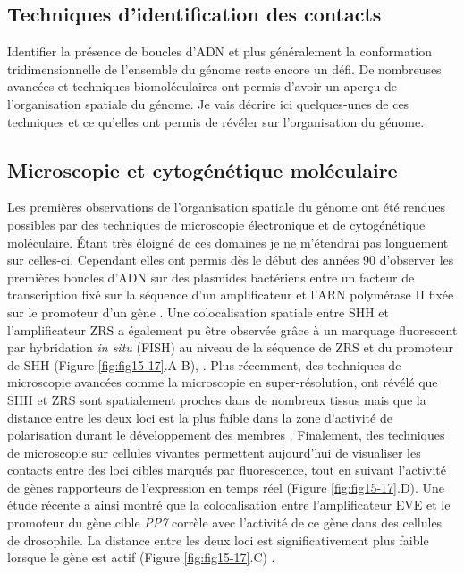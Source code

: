 \subsection{Techniques d’identification des contacts}
\label{subsec:contact-identification}

Identifier la présence de boucles d’ADN et plus généralement la conformation tridimensionnelle de l’ensemble du génome reste encore un défi. De nombreuses avancées et techniques biomoléculaires ont permis d’avoir un aperçu de l’organisation spatiale du génome. Je vais décrire ici quelques-unes de ces techniques et ce qu’elles ont permis de révéler sur l’organisation du génome.

\subsection{Microscopie et cytogénétique moléculaire}
\label{subsec:microscopie}

Les premières observations de l’organisation spatiale du génome ont été rendues possibles par des techniques de microscopie électronique et de cytogénétique moléculaire. Étant très éloigné de ces domaines je ne m'étendrai pas longuement sur celles-ci. Cependant elles ont permis dès le début des années 90 d’observer les premières boucles d’ADN sur des plasmides bactériens entre un facteur de transcription fixé sur la séquence d’un \gls{amplificateur} et l’ARN polymérase II fixée sur le promoteur d’un gène \citep{su_dna-looping_1990}. Une colocalisation spatiale entre \acrshort{SHH} et l’\gls{amplificateur} \acrshort{ZRS} a également pu être observée grâce à un marquage fluorescent par hybridation \textit{in situ} (FISH) au niveau de la séquence de \acrshort{ZRS} et du promoteur de \acrshort{SHH} (Figure \ref{fig:fig15-17}.A-B), \citep{amano_chromosomal_2009}. Plus récemment, des techniques de microscopie avancées comme la microscopie en super-résolution, ont révélé que \acrshort{SHH} et \acrshort{ZRS} sont spatialement proches dans de nombreux tissus mais que la distance entre les deux loci est la plus faible dans la zone d’activité de polarisation durant le développement des membres \citep{williamson_shh_2016}. Finalement, des techniques de microscopie sur cellules vivantes permettent aujourd’hui de visualiser les contacts entre des loci cibles marqués par fluorescence, tout en suivant l’activité de gènes rapporteurs de l’expression en temps réel (Figure \ref{fig:fig15-17}.D). Une étude récente a ainsi montré que la colocalisation entre l’\gls{amplificateur} EVE et le promoteur du gène cible \textit{PP7} corrèle avec l’activité de ce gène dans des cellules de drosophile. La distance entre les deux loci est significativement plus faible lorsque le gène est actif (Figure \ref{fig:fig15-17}.C) \citep{chen_dynamic_2018}. \\

